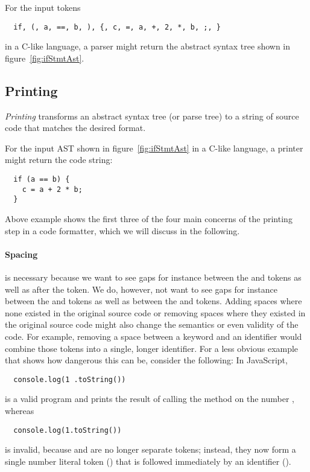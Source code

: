 For the input tokens
\begin{verbatim}
  if, (, a, ==, b, ), {, c, =, a, +, 2, *, b, ;, }
\end{verbatim}
in a C-like language, a parser might return the abstract syntax tree shown in figure~\ref{fig:ifStmtAst}.

\subsection{Printing}
\textit{Printing} transforms an abstract syntax tree (or parse tree)
to a string of source code that matches the desired format.

For the input AST shown in figure~\ref{fig:ifStmtAst} in a C-like language,
a printer might return the code string:

\begin{verbatim}
  if (a == b) {
    c = a + 2 * b;
  }
\end{verbatim}

Above example shows the first three of the four main concerns of the printing step in a code formatter,
which we will discuss in the following.

\paragraph{Spacing} is necessary because we want to see gaps for instance
between the  and \code{==} tokens as well as after the \code{)} token.
We do, however, not want to see gaps for instance
between the \code{(} and  tokens as well as between the  and \code{;} tokens.
Adding spaces where none existed in the original source code
or removing spaces where they existed in the original source code
might also change the semantics or even validity of the code.
For example, removing a space between a keyword and an identifier
would combine those tokens into a single, longer identifier.
For a less obvious example that shows how dangerous this can be, consider the following: In JavaScript,
\begin{verbatim}
  console.log(1 .toString())
\end{verbatim}
is a valid program and prints the result of
calling the method  on the number , whereas
\begin{verbatim}
  console.log(1.toString())
\end{verbatim}
is invalid, because  and  are no longer separate tokens;
instead, they now form a single number literal token ()
that is followed immediately by an identifier ().

